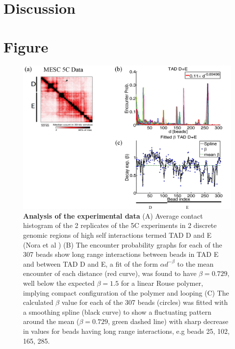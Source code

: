 \documentclass[12pt]{article}
\begin{document}


\section{Discussion}\label{section_discussion}

\section{Figure}\label{section_figures}

\begin{figure}[H]
\includegraphics[scale=0.7]{Figure01_AnalysisOfTheExperimentalData}
\caption{\textbf{Analysis of the experimental data} (A) Average contact histogram of the 2 replicates of the 5C experiments in 2 discrete genomic regions of high self interactions termed TAD D and E (Nora et al \cite{Nora2012}) (B) The encounter probability graphs for each of the 307 beads show long range interactions between beads in TAD E and between TAD D and E, a fit of the form $\alpha d ^{-\beta}$ to the mean encounter of each distance (red curve), was found to have $\beta=0.729$, well below the expected $\beta=1.5$ for a linear Rouse polymer, implying compact configuration of the polymer and looping (C) The calculated $\beta$ value for each of the 307 beads (circles) was fitted with a smoothing spline (black curve) to show a fluctuating pattern around the mean ($\beta=0.729$, green dashed line) with sharp decrease in values for beads having long range interactions, e.g beads 25, 102, 165, 285.}
\label{figure_TADDAndENoraEtAl2012}
\end{figure}
\end{document}
